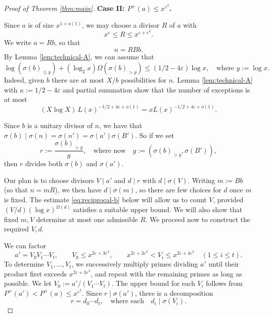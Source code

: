 \documentclass[11pt]{amsart}
\begin{document}
\begin{proof}[Proof of Theorem \ref{thm:main}]
\medskip
{}
\noindent\textbf{Case II: $P^{+}(a)\le x^{\varepsilon^2}$.}

Since $a$ is of size $x^{1+o(1)}$, we may choose a divisor $R$ of $a$ with
\[
 x^\varepsilon\le R\le x^{\varepsilon+\varepsilon^2}.
\]
We write $a=Rb$, so that
\[
 n=RBb.
\]
By Lemma \ref{lem:technical-A}, we can assume that
\begin{equation}\label{eq:case-II-mass}
 \log(\sigma(b)_{\le y})+(\log_2 x)\Omega(\sigma(b)_{>y})
 \le (1/2-4\varepsilon)\log x,
 \quad \text{where~} y:=\log x.
\end{equation}
Indeed, given $b$ there are at most $X/b$ possibilities for $n$. Lemma \ref{lem:technical-A} with $\kappa:=1/2-4\varepsilon$ and partial summation show that the number of exceptions is at most
\[
 (X\log X)\,L(x)^{-1/2+4\varepsilon+o(1)}
 =xL(x)^{-1/2+4\varepsilon+o(1)}.
\]

Since $b$ is a unitary divisor of $n$, we have that $\sigma(b)\mid \sigma(n) = \sigma(n') = \sigma(a')\sigma(B')$. So if we set
\[
 r:=\frac{\sigma(b)_{>y}}{g}, \quad\text{where now}\quad g:= (\sigma(b)_{>y}, \sigma(B')),
\]
then $r$ divides both $\sigma(b)$ and $\sigma(a')$.

Our plan is to choose divisors $V\mid a'$ and $d\mid r$ with
$d\mid\sigma(V)$. Writing $m:=Bb$ (so that $n=mR$), we then have
$d\mid\sigma(m)$, so there are few choices for $d$ once
$m$ is fixed. The estimate \eqref{eq:reciprocal-b} below will allow us to count \(V\), provided \((V/d)(\log x)^{\Omega(d)}\) satisfies a suitable upper bound. We will also show that fixed $m,V$ determine at most one
admissible $R$. We proceed now to construct the required $V,d$.

We can factor
\[
 a'=V_0V_1\cdots V_t,\qquad
 V_0\le x^{2\varepsilon+3\varepsilon^2},\qquad
 x^{2\varepsilon+3\varepsilon^2}<V_i
 \le x^{2\varepsilon+4\varepsilon^2}\quad(1\le i\le t).
\]
To determine $V_1,\dots,V_t$, we successively multiply primes dividing $a'$ until their product first exceeds $x^{2\varepsilon+3\varepsilon^2}$, and repeat with the remaining primes as long as possible. We let $V_0:=a'/(V_1\cdots V_t)$. The upper bound for each $V_i$ follows from $P^+(a')<P^+(a)\le x^{\varepsilon^2}$.
Since $r\mid\sigma(a')$, there is a decomposition
\[
 r=d_0\cdots d_t, \quad\text{where each}\quad d_i\mid\sigma(V_i).
\]


\end{proof}
\end{document}
